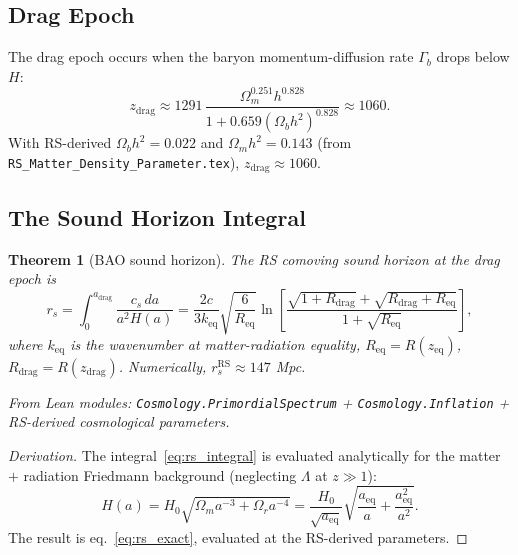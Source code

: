 \documentclass[12pt,a4paper]{article}
\newtheorem{theorem}{Theorem}[section]
\theoremstyle{definition}
\theoremstyle{remark}
\begin{document}
\subsection{Drag Epoch}

The drag epoch occurs when the baryon momentum-diffusion rate $\Gamma_b$
drops below $H$:
\begin{equation}
  z_\mathrm{drag} \approx 1291\,\frac{\Omega_m^{0.251} h^{0.828}}
  {1 + 0.659(\Omega_b h^2)^{0.828}} \approx 1060.
\end{equation}
With RS-derived $\Omega_b h^2 = 0.022$ and $\Omega_m h^2 = 0.143$
(from \texttt{RS\_Matter\_Density\_Parameter.tex}), $z_\mathrm{drag} \approx
1060$.

\subsection{The Sound Horizon Integral}

\begin{theorem}[BAO sound horizon]\label{thm:rs}
The RS comoving sound horizon at the drag epoch is
\begin{equation}
  r_s = \int_0^{a_\mathrm{drag}} \frac{c_s\,da}{a^2 H(a)}
  = \frac{2c}{3k_\mathrm{eq}}
  \sqrt{\frac{6}{R_\mathrm{eq}}} \ln\!\left[
  \frac{\sqrt{1 + R_\mathrm{drag}} + \sqrt{R_\mathrm{drag} + R_\mathrm{eq}}}
  {1 + \sqrt{R_\mathrm{eq}}}
  \right],
  \label{eq:rs_exact}
\end{equation}
where $k_\mathrm{eq}$ is the wavenumber at matter-radiation equality,
$R_\mathrm{eq} = R(z_\mathrm{eq})$, $R_\mathrm{drag} = R(z_\mathrm{drag})$.
Numerically, $r_s^\mathrm{RS} \approx 147$ Mpc.

From Lean modules: \texttt{Cosmology.PrimordialSpectrum} +
\texttt{Cosmology.Inflation} + RS-derived cosmological parameters.
\end{theorem}

\begin{proof}[Derivation]
The integral~\eqref{eq:rs_integral} is evaluated analytically for the
matter $+$ radiation Friedmann background (neglecting $\Lambda$ at
$z \gg 1$):
\begin{equation}
  H(a) = H_0\sqrt{\Omega_m a^{-3} + \Omega_r a^{-4}}
  = \frac{H_0}{\sqrt{a_\mathrm{eq}}}\sqrt{\frac{a_\mathrm{eq}}{a} + \frac{a_\mathrm{eq}^2}{a^2}}.
\end{equation}
The result is eq.~\eqref{eq:rs_exact}, evaluated at the RS-derived
parameters.
\end{proof}
\end{document}
